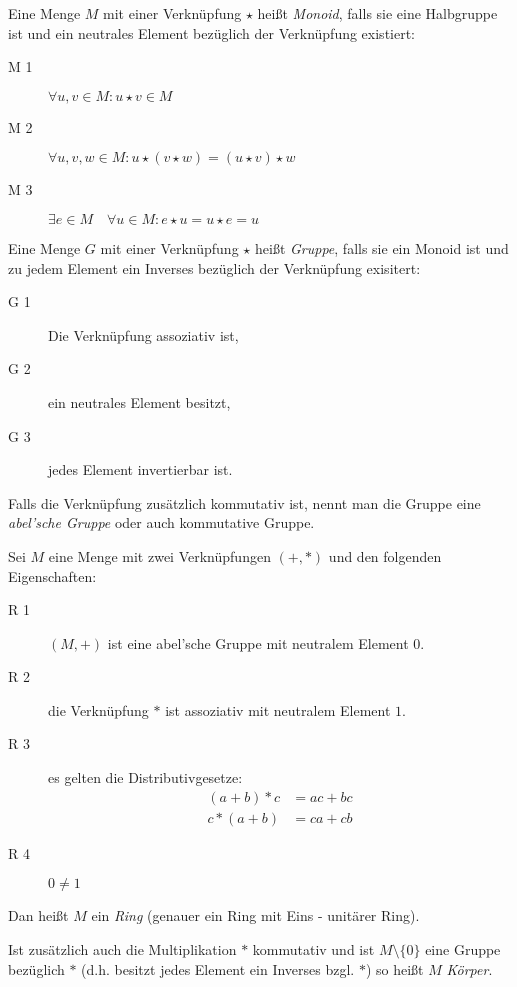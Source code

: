 Eine Menge $M$ mit einer Verknüpfung $\star$ heißt \emph{Monoid}, falls sie eine Halbgruppe ist und ein neutrales Element bezüglich der Verknüpfung existiert:
\begin{description}
  \item[M 1] $\forall u,v \in M: u\star v\in M$
  \item[M 2] $\forall u,v,w \in M: u\star(v\star w)=(u\star v)\star w$
  \item[M 3] $\exists e \in M \quad \forall u\in M: e\star u=u\star e = u$
\end{description}

Eine Menge $G$ mit einer Verknüpfung $\star$ heißt \emph{Gruppe}, falls sie ein Monoid ist und zu jedem Element ein Inverses bezüglich der Verknüpfung exisitert:
\begin{description}
  \item[G 1] Die Verknüpfung assoziativ ist,
  \item[G 2] ein neutrales Element besitzt,
  \item[G 3] jedes Element invertierbar ist.
\end{description}
Falls die Verknüpfung zusätzlich kommutativ ist, nennt man die Gruppe eine \emph{abel'sche Gruppe} oder auch kommutative Gruppe.

Sei $M$ eine Menge mit zwei Verknüpfungen $(+,*)$ und den folgenden Eigenschaften:
\begin{description}
  \item[R 1] $(M,+)$ ist eine abel'sche Gruppe mit neutralem Element $0$.
  \item[R 2] die Verknüpfung $*$ ist assoziativ mit neutralem Element $1$.
  \item[R 3] es gelten die Distributivgesetze:
  \begin{align*}
    (a+b)* c&=ac+bc\\
    c*(a+b)&=ca+cb
  \end{align*}
  \item[R 4] $0\neq 1$
\end{description}
Dan heißt $M$ ein \emph{Ring} (genauer ein Ring mit Eins - unitärer Ring).

\vspace{1em}
Ist zusätzlich auch die Multiplikation $*$ kommutativ und ist $M\setminus\{0\}$ eine Gruppe bezüglich $*$ (d.h. besitzt jedes Element ein Inverses bzgl. $*$) so heißt $M$ \emph{Körper}.
\par

